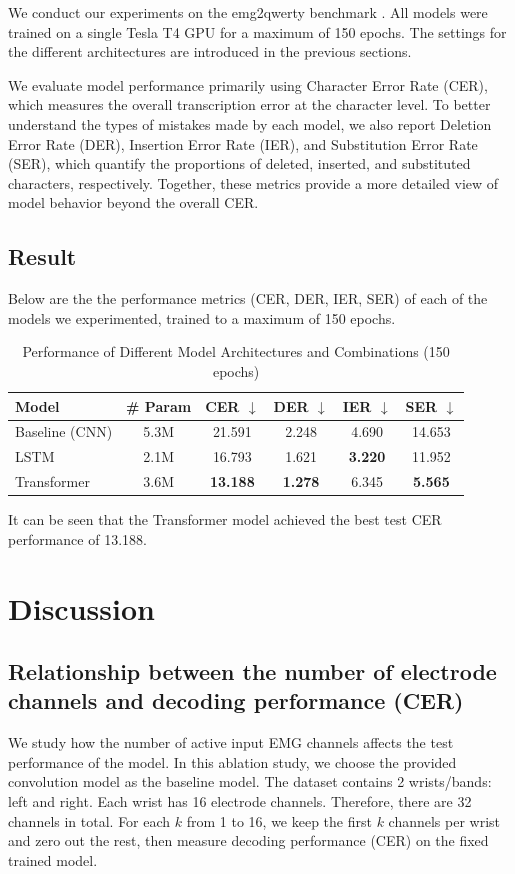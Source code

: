 \documentclass{article}
\begin{document}
We conduct our experiments on the emg2qwerty benchmark \cite{emg2qwerty_neurips2024}. All models were trained on a single Tesla T4 GPU for a maximum of 150 epochs. The settings for the different architectures are introduced in the previous sections.

We evaluate model performance primarily using Character Error Rate (CER), which measures the overall transcription error at the character level. To better understand the types of mistakes made by each model, we also report Deletion Error Rate (DER), Insertion Error Rate (IER), and Substitution Error Rate (SER), which quantify the proportions of deleted, inserted, and substituted characters, respectively. Together, these metrics provide a more detailed view of model behavior beyond the overall CER.

\subsection{Result}

Below are the the performance metrics (CER, DER, IER, SER) of each of the models we experimented, trained to a maximum of 150 epochs. 

\begin{table}[h]
\centering
\begin{tabular}{lccccc}
\toprule
Model &
\# Param &
CER $\downarrow$ &
DER $\downarrow$ &
IER $\downarrow$ &
SER $\downarrow$ \\
\midrule
Baseline (CNN) & 5.3M & 21.591 & 2.248 & 4.690 & 14.653 \\
LSTM & 2.1M & 16.793 & 1.621 & \textbf{3.220} & 11.952 \\
Transformer & 3.6M & \textbf{13.188} & \textbf{1.278} & 6.345 & \textbf{5.565} \\
\bottomrule
\end{tabular}
\vspace{0.2cm}
\caption{Performance of Different Model Architectures and Combinations (150 epochs)}
\label{tab:result1}
\end{table}

It can be seen that the Transformer model achieved the best test CER performance of 13.188.

\section{Discussion}

\subsection{Relationship between the number of electrode channels and decoding performance (CER)}
We study how the number of active input EMG channels affects the test performance of the model. In this ablation study, we choose the provided convolution model as the baseline model. The dataset contains 2 wrists/bands: left and right. Each wrist has 16 electrode channels. Therefore, there are 32 channels in total. For each $k$ from 1 to 16, we keep the first $k$ channels per wrist and zero out the rest, then measure decoding performance (CER) on the fixed trained model.
\end{document}
